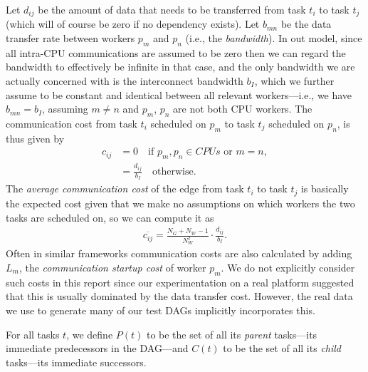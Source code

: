 \documentclass[runningheads]{llncs}
\begin{document}
Let $d_{ij}$ be the amount of data that needs to be transferred from task $t_i$ to task $t_j$ (which will of course be zero if no dependency exists). Let $b_{mn}$ be the data transfer rate between workers $p_m$ and $p_n$ (i.e., the {\em bandwidth}). In out model, since all intra-CPU communications are assumed to be zero then we can regard the bandwidth to effectively be infinite in that case, and the only bandwidth we are actually concerned with is the interconnect bandwidth $b_{I}$, which we further assume to be constant and identical between all relevant workers---i.e., we have $b_{mn} = b_{I}$, assuming $m \neq n$ and $p_m$, $p_n$ are not both CPU workers. The communication cost from task $t_i$ scheduled on $p_m$ to task $t_j$ scheduled on $p_n$, is thus given by
\begin{align*}
c_{ij} &= 0 \quad \text{if } p_m, p_n \in CPUs \text{ or } m = n,\\
&= \frac{d_{ij}}{b_{I}} \quad \text{otherwise}.
\end{align*} 
The {\em average communication cost} of the edge from task $t_i$ to task $t_j$ is basically the expected cost given that we make no assumptions on which workers the two tasks are scheduled on, so we can compute it as
\begin{align}
\label{eq.avg_comm}
\overline{c_{ij}} = \frac{N_G + N_W - 1}{N_W^2} \cdot  \frac{d_{ij}}{b_I}.
\end{align}
Often in similar frameworks communication costs are also calculated by adding $L_m$, the {\em communication startup cost} of worker $p_m$. We do not explicitly consider such costs in this report since our  experimentation on a real platform suggested that this is usually dominated by the data transfer cost. However, the real data we use to generate many of our test DAGs implicitly incorporates this.    

For all tasks $t$, we define $P(t)$ to be the set of all its {\em parent} tasks---its immediate predecessors in the DAG---and $C(t)$ to be the set of all its {\em child} tasks---its immediate successors.
\end{document}
